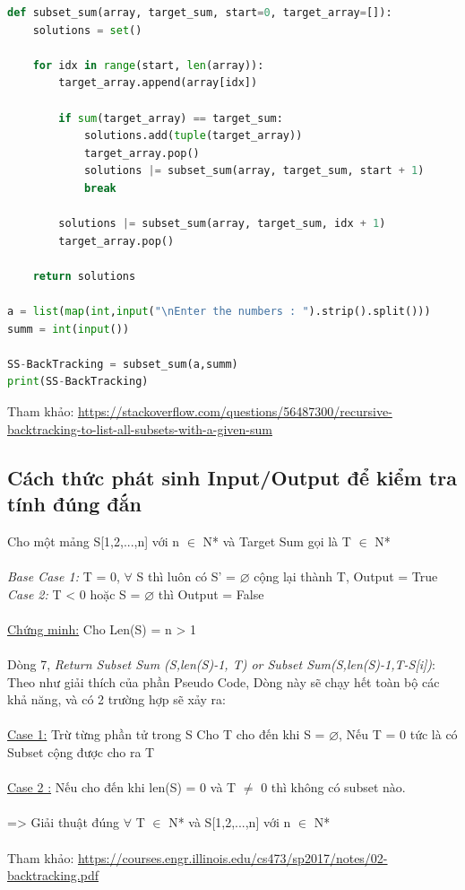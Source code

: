 \documentclass{article}
\begin{document}
    \begin{lstlisting}[language=Python, caption=Code Demo]
	def subset_sum(array, target_sum, start=0, target_array=[]):  
    solutions = set()

    for idx in range(start, len(array)):
        target_array.append(array[idx])

        if sum(target_array) == target_sum:
            solutions.add(tuple(target_array))
            target_array.pop()
            solutions |= subset_sum(array, target_sum, start + 1)
            break

        solutions |= subset_sum(array, target_sum, idx + 1)
        target_array.pop()

    return solutions

a = list(map(int,input("\nEnter the numbers : ").strip().split()))
summ = int(input())

SS-BackTracking = subset_sum(a,summ)
print(SS-BackTracking)

\end{lstlisting}
Tham khảo: \url{https://stackoverflow.com/questions/56487300/recursive-backtracking-to-list-all-subsets-with-a-given-sum}\\
    \subsection{ \fontsize{16}{16}\selectfont\textbf{Cách thức phát sinh Input/Output để kiểm tra tính đúng đắn}}
    Cho một mảng S[1,2,...,n] với n $\in$ N* và Target Sum gọi là T $\in$ N*\\\\
    \textit{Base Case 1:} T = 0, $\forall$ S thì luôn có S' = $\varnothing$ cộng lại thành T, Output = True\\
    \hspace*{1.3cm}\textit{Case 2:} T < 0 hoặc S = $\varnothing$ thì Output = False\\\\
    \underline{Chứng minh:} Cho Len(S) = n > 1\\\\
    Dòng 7, \textit{Return Subset Sum (S,len(S)-1, T) or Subset Sum(S,len(S)-1,T-S[i])}: Theo như giải thích của phần Pseudo Code, Dòng này sẽ chạy hết toàn bộ các khả năng, và có 2 trường hợp sẽ xảy ra:\\\\
    \underline{Case 1:} Trừ từng phần tử trong S Cho T cho đến khi S = $\varnothing$, Nếu T = 0 tức là có Subset cộng được cho ra T\\\\
    \underline{Case 2 :} Nếu cho đến khi len(S) = 0 và T $\neq$ 0 thì không có subset nào.\\\\
    => Giải thuật đúng $\forall$ T $\in$ N* và S[1,2,...,n] với n $\in$ N* \\\\
    Tham khảo: \url{https://courses.engr.illinois.edu/cs473/sp2017/notes/02-backtracking.pdf}
    \newpage
\end{document}
